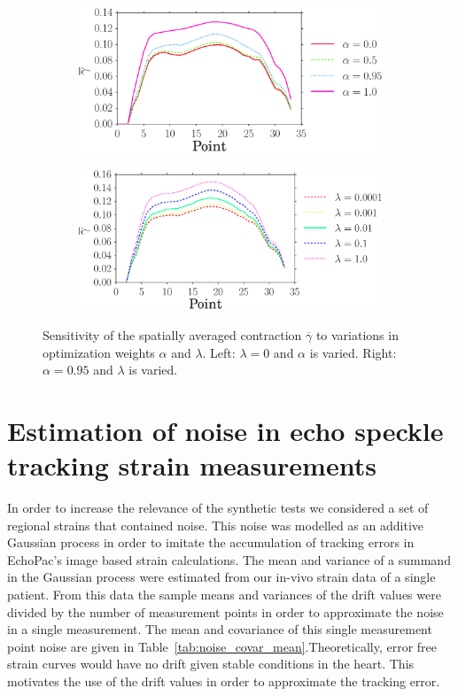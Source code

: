 \begin{figure}[htbp]
\centering
\begin{subfigure}[t]{0.49\textwidth}
     {\includegraphics[width=\textwidth]{mean_gamma_varying_alpha}}
     \caption*{\label{fig:gamma_sense_alpha}}
\end{subfigure}
\begin{subfigure}[t]{0.49\textwidth}
    {\includegraphics[width=\textwidth]{mean_gamma_varying_lambda}}
    \caption*{\label{fig:gamma_sense_lmbda}}
\end{subfigure}
\caption{Sensitivity of the spatially averaged contraction $\overline{\gamma}$ 
to variations in optimization weights $\alpha$ and $\lambda$. Left: $\lambda = 0$ and 
$\alpha$ is varied. Right: $\alpha = 0.95$ and $\lambda$ is varied.}
\label{fig:gamma_sense_alpha_lambda}
\end{figure}


\section{Estimation of noise in echo speckle tracking strain measurements}
\label{sec:strain_noise_est}
In order to increase the relevance of the synthetic tests we
considered a set of regional strains that contained noise. This
noise was modelled as an additive Gaussian process in order to imitate
the accumulation of tracking errors in EchoPac's image based strain
calculations. The mean and variance of a summand in the Gaussian
process were estimated from our in-vivo strain data of a single patient. From this data 
the sample means and variances of
the drift values were divided by the number of measurement points in order to approximate the noise in 
a single measurement. The mean and covariance of this single measurement point noise are given in
Table~\ref{tab:noise_covar_mean}.Theoretically, error free strain
curves would have no drift given stable conditions in the heart.
This motivates the use of the drift values in order to approximate 
the tracking error.

